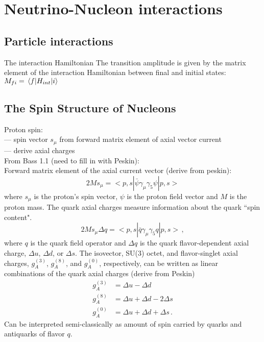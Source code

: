 \section{Neutrino-Nucleon interactions} \label{sec:theory}
\hspace{\parindent}

\subsection{Particle interactions}
  The interaction Hamiltonian
  The transition amplitude is given by the matrix element of the interaction
  Hamiltonian between final and initial states: $M_{fi} = \mel{f}{H_{int}}{i}$


\subsection{The Spin Structure of Nucleons} \label{sec:nuctheory}
  Proton spin: \\
  --- spin vector $s_{\mu}$ from forward matrix element of axial vector current \\
  --- derive axial charges \\
  From Bass 1.1 (need to fill in with Peskin): \\
  Forward matrix element of the axial current vector (derive from peskin):
  \[
      2Ms_{\mu} = <p,s|\bar{\psi}\gamma_{\mu} \gamma_{5} \psi|p,s>
  \]
  where $s_{\mu}$ is the proton's spin vector, $\psi$ is the proton field
  vector and $M$ is the proton mass. The quark axial charges measure
  information about the quark ``spin content".
  \[
    2Ms_{\mu}\Delta q = <p,s| \bar{q}\gamma_{\mu}\gamma_{5}q|p,s> \,,
  \]
  where $q$ is the quark field operator and $\Delta q$ is the quark
  flavor-dependent axial charge, $\Delta u$, $\Delta d$, or $\Delta s$. The
  isovector, SU(3) octet, and flavor-singlet axial charges, $g_A^{(3)}$,
  $g_A^{(8)}$, and $g_A^{(0)}$, respectively, can be written as linear
  combinations of the quark axial charges (derive from Peskin)
  \begin{align}
      g_A^{(3)} &= \Delta u - \Delta d \\
      g_A^{(8)} &= \Delta u + \Delta d - 2\Delta s \\
      g_A^{(0)} &= \Delta u + \Delta d + \Delta s \,.
  \end{align}
  Can be interpreted semi-classically as amount of spin carried by quarks and
  antiquarks of flavor $q$.

